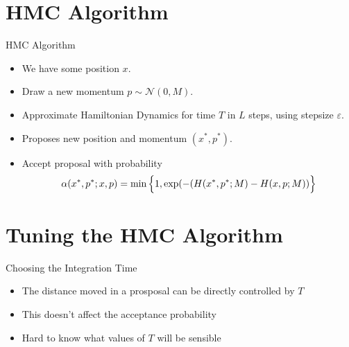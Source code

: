 \documentclass{beamer}
\begin{document}



\section{HMC Algorithm}

\begin{frame}{HMC Algorithm}
\begin{itemize}

\item We have some position $x$.

\item Draw a new momentum $ p \sim \mathcal{N}(0, M)$.

\item Approximate Hamiltonian Dynamics for time $T$ in $L$ steps, using stepsize $\varepsilon$. 

\item Proposes new position and momentum $(x^{*}, p^{*})$. 

\item Accept proposal with probability $$ \alpha(x^{*}, p^{*} ;x, p) = \min \Big{\{} 1, \exp(-(H(x^{*}, p^{*};M) - H(x,p;M)) \Big{\}} $$
\end{itemize}

\end{frame}


\section{Tuning the HMC Algorithm}


\begin{frame}{Choosing the Integration Time}

\begin{itemize}

\item The distance moved in a prosposal can be directly controlled by $T$ \vskip 5mm

\item This doesn't affect the acceptance probability \vskip 5mm

\item Hard to know what values of $T$ will be sensible

\end{itemize}

\end{frame}
\end{document}
